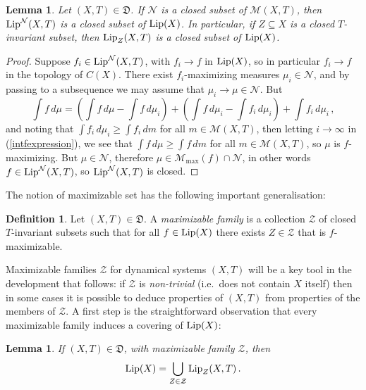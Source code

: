 \documentclass[reqno,11pt]{amsart}
\newtheorem{lem}[thm]{Lemma}
\theoremstyle{definition}
\newtheorem{defn}[thm]{Definition}
\theoremstyle{remark}
\theoremstyle{remark}
\def\m{\mathcal M}
\def\n{\mathcal N}
\def\lip{{\rm Lip}}
\def\ZZ{\mathcal{Z}}
\def\D{\mathfrak{D}}
\numberwithin{equation}{section}
\begin{document}
\begin{lem}\label{LZclosed}
Let $(X,T)\in\D$.
If $\n$ is a closed subset of $\m(X,T)$,
then $\lip^\n(X,T)$ is a closed subset of $\lip(X)$.
In particular,  if $Z\subseteq X$ is a closed $T$-invariant subset, then
$\lip_Z(X,T)$ is a closed subset of $\lip(X)$.
\end{lem}
\begin{proof}
Suppose $f_i\in \lip^\n(X,T)$, with $f_i\to f$ in $\lip(X)$, so in particular $f_i\to f$ in the topology of $C(X)$.
There exist $f_i$-maximizing measures $\mu_i\in\n$, and by passing to a subsequence we may assume that
$\mu_i\to\mu\in\n$.
But 
\begin{equation}\label{intfexpression}
\int f\,d\mu = \left(\int f\, d\mu -\int f\, d\mu_i\right) +\left(\int f\, d\mu_i - \int f_i\, d\mu_i\right) +  \int f_i\, d\mu_i\,,
\end{equation}
and noting that $\int f_i\, d\mu_i \ge \int f_i\, dm$ for all $m\in\m(X,T)$,
then letting $i\to\infty$  in (\ref{intfexpression}), we see that
$\int f\, d\mu\ge \int f\, dm$ for all $m\in\m(X,T)$, 
so $\mu$ is $f$-maximizing.
But $\mu\in\n$, therefore $\mu\in\m_{\max}(f)\cap\n$, in other words $f\in \lip^\n(X,T)$, so $\lip^\n(X,T)$ is closed.
\end{proof}





The notion of maximizable set 
has the following important generalisation:


\begin{defn}\label{maximizablefamily}
Let $(X,T)\in\D$.
A
\emph{maximizable family}
is a collection $\ZZ$ of closed $T$-invariant subsets 
such that
for all $f\in \lip(X)$ there exists $Z\in\ZZ$ that
is $f$-maximizable.
\end{defn}


Maximizable families $\ZZ$ for dynamical systems $(X,T)$ will be a key tool in the development
that follows: if $\ZZ$ is \emph{non-trivial} (i.e.~does not contain $X$ itself)
then in some cases it is possible to deduce properties of $(X,T)$ from properties of the members of $\ZZ$.
A first step is the straightforward observation that every maximizable family induces a covering of $\lip(X)$:

\begin{lem}\label{LZcoversL}
If $(X,T)\in\D$, with maximizable family $\ZZ$, then
\begin{equation}\label{coverL}
\lip(X) = \bigcup_{Z\in\ZZ} \lip_Z(X,T)\,.
\end{equation} 
\end{lem}
\end{document}

